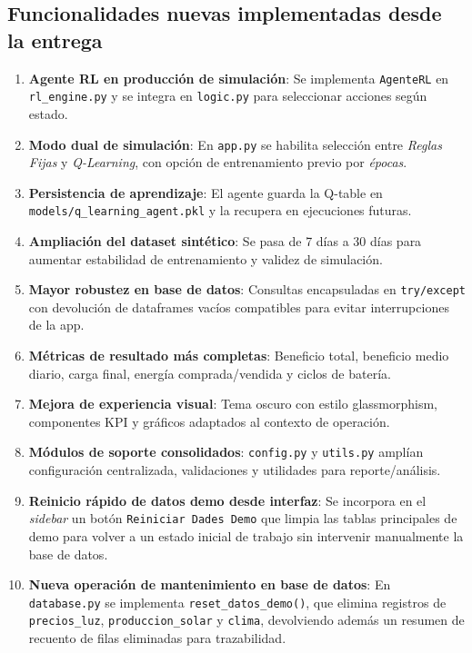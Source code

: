 \documentclass[12pt,a4paper]{article}
\begin{document}
\subsection{Funcionalidades nuevas implementadas desde la entrega}
\begin{enumerate}
    \item \textbf{Agente RL en producci\'on de simulaci\'on}:
    Se implementa \texttt{AgenteRL} en \texttt{rl\_engine.py} y se integra en \texttt{logic.py} para seleccionar acciones seg\'un estado.

    \item \textbf{Modo dual de simulaci\'on}:
    En \texttt{app.py} se habilita selecci\'on entre \textit{Reglas Fijas} y \textit{Q-Learning}, con opci\'on de entrenamiento previo por \textit{\'epocas}.

    \item \textbf{Persistencia de aprendizaje}:
    El agente guarda la Q-table en \texttt{models/q\_learning\_agent.pkl} y la recupera en ejecuciones futuras.

    \item \textbf{Ampliaci\'on del dataset sint\'etico}:
    Se pasa de 7 d\'ias a 30 d\'ias para aumentar estabilidad de entrenamiento y validez de simulaci\'on.

    \item \textbf{Mayor robustez en base de datos}:
    Consultas encapsuladas en \texttt{try/except} con devoluci\'on de dataframes vac\'ios compatibles para evitar interrupciones de la app.

    \item \textbf{M\'etricas de resultado m\'as completas}:
    Beneficio total, beneficio medio diario, carga final, energ\'ia comprada/vendida y ciclos de bater\'ia.

    \item \textbf{Mejora de experiencia visual}:
    Tema oscuro con estilo glassmorphism, componentes KPI y gr\'aficos adaptados al contexto de operaci\'on.

    \item \textbf{M\'odulos de soporte consolidados}:
    \texttt{config.py} y \texttt{utils.py} ampl\'ian configuraci\'on centralizada, validaciones y utilidades para reporte/an\'alisis.

    \item \textbf{Reinicio r\'apido de datos demo desde interfaz}:
    Se incorpora en el \textit{sidebar} un bot\'on \texttt{Reiniciar Dades Demo} que limpia las tablas principales de demo para volver a un estado inicial de trabajo sin intervenir manualmente la base de datos.

    \item \textbf{Nueva operaci\'on de mantenimiento en base de datos}:
    En \texttt{database.py} se implementa \texttt{reset\_datos\_demo()}, que elimina registros de \texttt{precios\_luz}, \texttt{produccion\_solar} y \texttt{clima}, devolviendo adem\'as un resumen de recuento de filas eliminadas para trazabilidad.
\end{enumerate}
\end{document}
